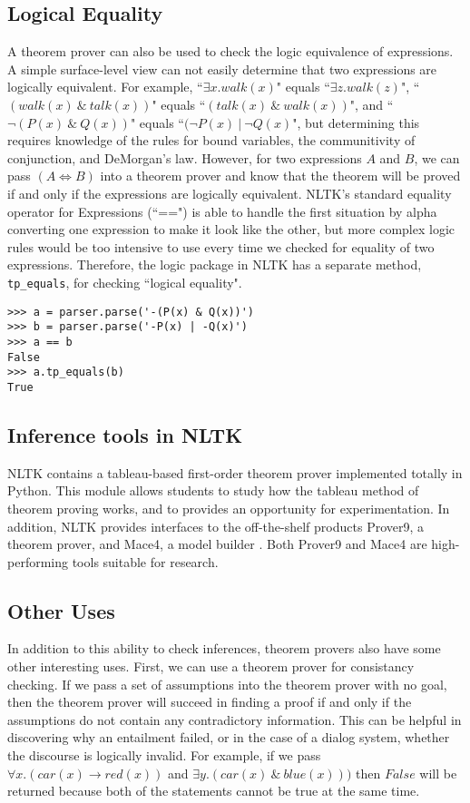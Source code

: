 \documentclass{article}
\newcommand{\dhgcode}[1]{{\tt #1}}
\begin{document}
\subsection{Logical Equality}
A theorem prover can also be used to check the logic equivalence of expressions.  A simple surface-level view can not easily determine that two expressions are logically equivalent.  For example, ``$\exists x.walk(x)$" equals ``$\exists z.walk(z)$", ``$(walk(x)~\&~talk(x))$" equals ``$(talk(x)~\&~walk(x))$", and ``$\neg(P(x)~\&~Q(x))$" equals ``$(\neg P(x)~|~\neg Q(x)$", but determining this requires knowledge of the rules for bound variables, the communitivity of conjunction, and DeMorgan's law.  However, for two expressions $A$ and $B$, we can pass $(A\iff B)$ into a theorem prover and know that the theorem will be proved if and only if the expressions are logically equivalent.  NLTK's standard equality operator for Expressions (``==") is able to handle the first situation by alpha converting one expression to make it look like the other, but more complex logic rules would be too intensive to use every time we checked for equality of two expressions.  Therefore, the logic package in NLTK has a separate method, \dhgcode{tp\_equals}, for checking ``logical equality".

\begin{verbatim}
>>> a = parser.parse('-(P(x) & Q(x))')
>>> b = parser.parse('-P(x) | -Q(x)')
>>> a == b
False
>>> a.tp_equals(b)
True
\end{verbatim}

\subsection{Inference tools in NLTK}
NLTK contains a tableau-based first-order theorem prover implemented totally in Python.  This module allows students to study how the tableau method of theorem proving works, and to provides an opportunity for experimentation.  In addition, NLTK provides interfaces to the off-the-shelf products Prover9, a theorem prover, and Mace4, a model builder \cite{McCune}.  Both Prover9 and Mace4 are high-performing tools suitable for research.

\subsection{Other Uses}
In addition to this ability to check inferences, theorem provers also have some other interesting uses.  First, we can use a theorem prover for consistancy checking.  If we pass a set of assumptions into the theorem prover with no goal, then the theorem prover will succeed in finding a proof if and only if the assumptions do not contain any contradictory information.  This can be helpful in discovering why an entailment failed, or in the case of a dialog system, whether the discourse is logically invalid.  For example, if we pass $\forall x.(car(x) \rightarrow red(x))$ and $\exists y.(car(x)~\&~blue(x)))$ then $False$ will be returned because both of the  statements cannot be true at the same time.  
\end{document}
